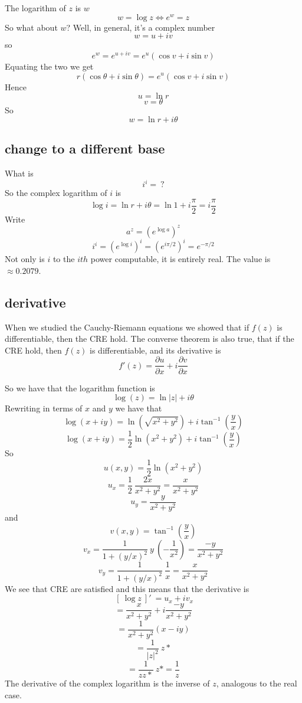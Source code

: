 \documentclass[11pt, oneside]{article}   	%
\begin{document}
The logarithm of $z$ is $w$
\[ w = \log z \iff e^w = z \]
So what about $w$? Well, in general, it's a complex number
\[ w = u + iv \]
so
\[ e^w = e^{u + iv} = e^u (\cos v + i \sin v) \]
Equating the two we get
\[ r (\cos \theta + i \sin \theta) = e^u (\cos v + i \sin v) \]
Hence
\[ u = \ln r \]
\[ v = \theta \]
So
\[ w = \ln r + i \theta \]
\subsection*{change to a different base}
What is 
\[ i^i = \  ? \]
So the complex logarithm of $i$ is
\[ \log i = \ln r + i \theta = \ln 1 + i \frac{\pi}{2} =  i \frac{\pi}{2} \]
 Write
\[ a^z = (e^{\log a})^z \]
\[ i^i = (e^{\log i})^i = (e^{i \pi/2})^i = e^{-\pi/2} \]
Not only is $i$ to the $ith$ power computable, it is entirely real.  The value is $\approx 0.2079$.
\subsection*{derivative}
When we studied the Cauchy-Riemann equations we showed that if $f(z)$ is differentiable, then the CRE hold.  The converse theorem is also true, that if the CRE hold, then $f(z)$ is differentiable, and its derivative is
\[ f'(z) = \frac{\partial u}{\partial x} + i \frac{\partial v}{\partial x} \]

So we have that the logarithm function is
\[ \log(z) = \ln |z| + i \theta \]
Rewriting in terms of $x$ and $y$ we have that
\[ \log (x+iy) = \ln (\sqrt{x^2 + y^2}) + i \tan^{-1} (\frac{y}{x}) \]
\[ \log (x+iy) = \frac{1}{2} \ln (x^2 + y^2) + i \tan^{-1} (\frac{y}{x}) \]
So
\[ u(x,y) = \frac{1}{2} \ln (x^2 + y^2) \]
\[ u_x = \frac{1}{2} \ \frac{2x}{x^2 + y^2} = \frac{x}{x^2 + y^2} \]
\[ u_y = \frac{y}{x^2 + y^2} \]
and 
\[ v(x,y) = \tan^{-1} (\frac{y}{x}) \]
\[ v_x = \frac{1}{1 + (y/x)^2} \ y \ (-\frac{1}{x^2}) = \frac{-y}{x^2 + y^2} \]
\[ v_y = \frac{1}{1 + (y/x)^2} \ \frac{1}{x} = \frac{x}{x^2 + y^2} \]
We see that CRE are satisfied and this means that the derivative is
\[ \ [ \ \log z \ ] ' \ = u_x + i v_x \]
\[ = \frac{x}{x^2 + y^2} + i \frac{-y}{x^2 + y^2} \] 
\[ = \frac{1}{x^2 + y^2} (x - i y) \]
\[ = \frac{1}{|z|^2} \ z* \]
\[ =  \frac{1}{zz*} \ z* = \frac{1}{z} \]
The derivative of the complex logarithm is the inverse of $z$, analogous to the real case.
\end{document}
